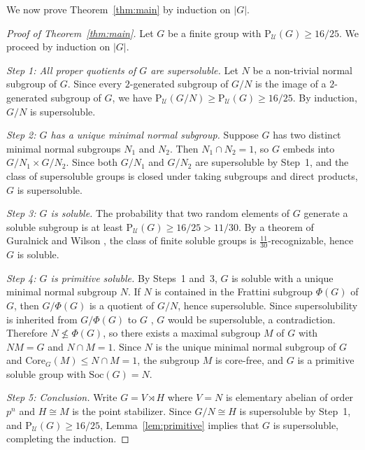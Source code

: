 \documentclass{amsart}
\newcommand{\Psu}{\mathrm{P}_{\mathcal{U}}}
\begin{document}
	We now prove Theorem~\ref{thm:main} by induction on $|G|$.
	
	\begin{proof}[Proof of Theorem~\ref{thm:main}]
		Let $G$ be a finite group with $\Psu(G) \geq 16/25$. We 
		proceed by induction on $|G|$.
		
		\medskip
		\noindent\textit{Step 1: All proper quotients of $G$ are 
			supersoluble.}
		Let $N$ be a non-trivial normal subgroup of $G$. Since every 
		$2$-generated subgroup of $G/N$ is the image of a $2$-generated 
		subgroup of $G$, we have $\Psu(G/N) \geq \Psu(G) \geq 16/25$. 
		By induction, $G/N$ is supersoluble.
		
		\medskip
		\noindent\textit{Step 2: $G$ has a unique minimal normal 
			subgroup.}
		Suppose $G$ has two distinct minimal normal subgroups $N_1$ 
		and $N_2$. Then $N_1 \cap N_2 = 1$, so $G$ embeds into 
		$G/N_1 \times G/N_2$. Since both $G/N_1$ and $G/N_2$ are 
		supersoluble by Step~1, and the class of supersoluble groups 
		is closed under taking subgroups and direct products, $G$ is 
		supersoluble. 
		
		\medskip
		\noindent\textit{Step 3: $G$ is soluble.}
	The probability that two random elements of $G$ generate a 
	soluble subgroup is at least $\Psu(G) \geq 16/25 > 11/30$. 
	By a theorem of Guralnick and Wilson \cite[Theorem A]{GW00}, 
	the class of finite soluble groups is $\frac{11}{30}$-recognizable, 
	hence $G$ is soluble.
		
		\medskip
		\noindent\textit{Step 4: $G$ is primitive soluble.}
		By Steps~1 and~3, $G$ is soluble with a unique minimal normal 
		subgroup $N$. If $N$ is contained in the Frattini subgroup $\Phi(G)$ of $G$, then $G/\Phi(G)$ is a 
		quotient of $G/N$, hence supersoluble. Since supersolubility 
		is inherited from $G/\Phi(G)$ to $G$ \cite[VI Satz 8.6]{hup},
		$G$ would be supersoluble, a contradiction. Therefore 
		$N \not\leq \Phi(G)$, so there exists a maximal subgroup $M$ 
		of $G$ with $NM = G$ and $N \cap M = 1$. Since $N$ is the 
		unique minimal normal subgroup of $G$ and $\mathrm{Core}_G(M) 
		\leq N \cap M = 1$, the subgroup $M$ is core-free, and $G$ 
		is a primitive soluble group with $\mathrm{Soc}(G) = N$.
		
		\medskip
		\noindent\textit{Step 5: Conclusion.}
		Write $G = V \rtimes H$ where $V = N$ is elementary abelian 
		of order $p^n$ and $H \cong M$ is the point stabilizer. 
		Since $G/N \cong H$ is supersoluble by Step~1, and 
		$\Psu(G) \geq 16/25$, Lemma~\ref{lem:primitive} implies 
		that $G$ is supersoluble, completing the induction.
		

\end{proof}
\end{document}
